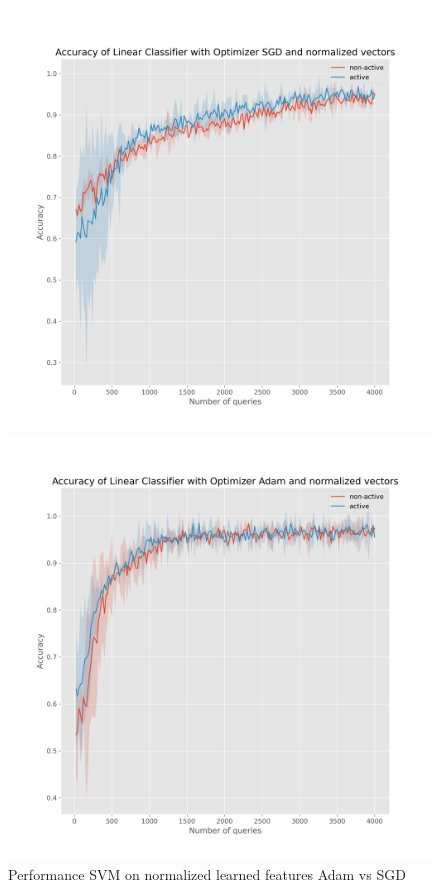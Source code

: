 \documentclass{article}
\begin{document}
\begin{figure}[t]
  \centering
  \begin{minipage}{.45\textwidth}
    \centering
    \includegraphics[width=\linewidth]{active-vs-base-moons-linear-loss-SGD-normalized-ci}
  \end{minipage}%
  \begin{minipage}{.45\textwidth}
    \centering
    \includegraphics[width=\linewidth]{active-vs-base-moons-linear-loss-Adam-normalized-ci}
  \end{minipage}
  \caption{Performance SVM on normalized learned features Adam vs SGD}\label{fig:svm-normalized-ci}
\end{figure}
\end{document}
